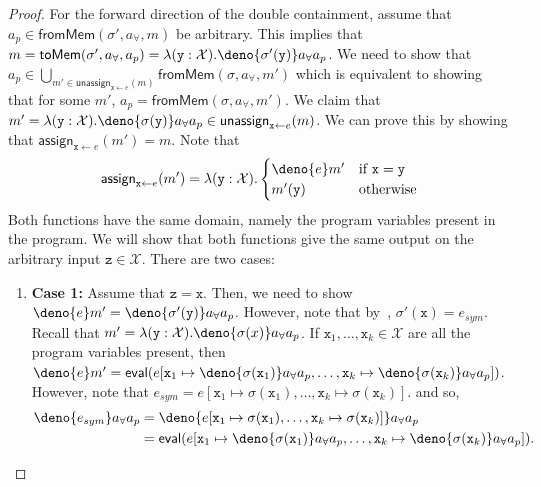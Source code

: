 \documentclass[acmsmall,review,anonymous]{acmart}\settopmatter{printfolios=true,printccs=false,printacmref=false}
\begin{document}
\begin{proof}
  For the forward direction of the double containment, assume that $a_p \in \mathsf{fromMem}(\sigma',a_{\forall},m)$ be arbitrary. This implies that $m = \mathsf{toMem}(\sigma',a_{\forall},a_p) = \lambda (\mathtt{y} : \mathcal{X}) . \deno{\sigma'(\mathtt{y})}a_{\forall}a_p$. We need to show that $a_p \in  \bigcup_{m' \in \mathsf{unassign}_{\mathtt{x}\gets e}(m)} \mathsf{fromMem}(\sigma,a_{\forall},m')$ which is equivalent to showing that for some $m'$, $a_p = \mathsf{fromMem}(\sigma,a_{\forall},m')$. We claim that $m' = \lambda (\mathtt{y} : \mathcal{X}) . \deno{\sigma(\mathtt{y})}a_{\forall}a_p \in \mathsf{unassign}_{\mathtt{x}\gets e}(m)$. We can prove this by showing that $\mathsf{assign}_{\mathtt{x}\gets e}(m') = m$. Note that
  \[
    \mathsf{assign}_{\mathtt{x}\gets e}(m') = \lambda (\mathtt{y} : \mathcal{X}) .
    \begin{cases}
      \deno{e}m' & \text{if $\mathtt{x} = \mathtt{y}$}\\
      m'(\mathtt{y}) & \text{otherwise}
    \end{cases}
  \]
  Both functions have the same domain, namely the program variables present in the program. We will show that both functions give the same output on the arbitrary input $\mathtt{z} \in \mathcal{X}$. There are two cases:
  \begin{enumerate}
  \item \textbf{Case 1:} Assume that $\mathtt{z} = \mathtt{x}$. Then, we need to show $\deno{e}m' = \deno{\sigma'(\mathtt{y})}a_{\forall}a_p$.
    However, note that by~, $\sigma'(\mathtt{x}) = e_{sym}$. Recall that $m' = \lambda (\mathtt{y} : \mathcal{X}) . \deno{\sigma(x)}a_{\forall}a_p$. If $\mathtt{x}_1,\ldots,\mathtt{x}_k \in \mathcal{X}$ are all the program variables present, then $\deno{e}m' = \mathsf{eval}(e[\mathtt{x}_1 \mapsto \deno{\sigma(\mathtt{x}_1)}a_{\forall}a_p, \ldots, \mathtt{x}_k \mapsto \deno{\sigma(\mathtt{x}_k)}a_{\forall}a_p])$.
    However, note that $e_{sym} = e[\mathtt{x}_1 \mapsto \sigma(\mathtt{x}_1),\ldots,\mathtt{x}_k \mapsto \sigma(\mathtt{x}_k)]$.
    and so,
    \begin{align*}
      \deno{e_{sym}}a_{\forall}a_p &= \deno{e[\mathtt{x}_1 \mapsto \sigma(\mathtt{x}_1),\ldots,\mathtt{x}_k \mapsto \sigma(\mathtt{x}_k)]}a_{\forall}a_p\\
                             &= \mathsf{eval}(e[\mathtt{x}_1 \mapsto \deno{\sigma(\mathtt{x}_1)}a_{\forall}a_p, \ldots, \mathtt{x}_k \mapsto \deno{\sigma(\mathtt{x}_k)}a_{\forall}a_p]).
    \end{align*}

\end{enumerate}
\end{proof}
\end{document}
